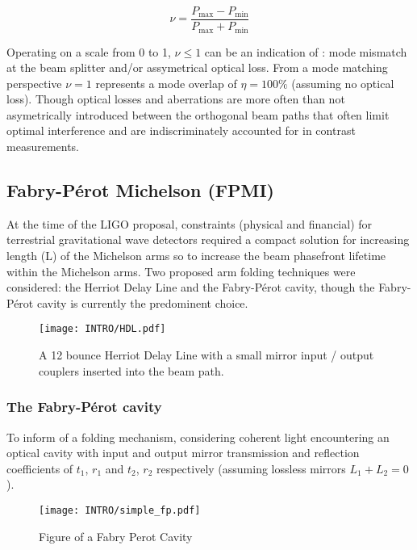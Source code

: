\begin{equation}\label{eq:contrast}
	\nu = \frac{P_\mathrm{max} - P_\mathrm{min}}{P_\mathrm{max} + P_\mathrm{min}}
\end{equation}

Operating on a scale from 0 to 1, $\nu \le 1$ can be an indication of : mode mismatch at the beam splitter and/or assymetrical optical loss. From a mode matching perspective $\nu = 1$ represents a mode overlap of $\eta = 100 \%$ (assuming no optical loss).  Though optical losses and aberrations are more often than not asymetrically introduced between the orthogonal beam paths that often limit optimal interference and are indiscriminately accounted for in contrast measurements.  

\subsection{Fabry-P\'{e}rot Michelson (FPMI)}
At the time of the LIGO proposal, constraints (physical and financial) for terrestrial gravitational wave detectors required a compact solution for increasing length (L) of the Michelson arms so to increase the beam phasefront lifetime within the Michelson arms. Two proposed arm folding techniques were considered: the Herriot Delay Line and the Fabry-P\'{e}rot cavity, though the Fabry-P\'{e}rot cavity is currently the predominent choice.

\begin{figure}[ht!]
	\centering
	\texttt{[image: INTRO/HDL.pdf]}
	\caption{A 12 bounce Herriot Delay Line with a small mirror input / output couplers inserted into the beam path.}
	\label{fig:hdlcav}
\end{figure}

\subsubsection{The Fabry-P\'{e}rot cavity}
\label{sec:FPC}
To inform of a folding mechanism, considering coherent light encountering an optical cavity with input and output mirror transmission and reflection coefficients of $t_1$, $r_1$ and $t_2$, $r_2$ respectively (assuming lossless mirrors $L_1 + L_2=0$).

\begin{figure}[h!]
	\centering
	\texttt{[image: INTRO/simple\_fp.pdf]}
	\caption{Figure of a Fabry Perot Cavity}
	\label{fig:fpcav}
\end{figure}

